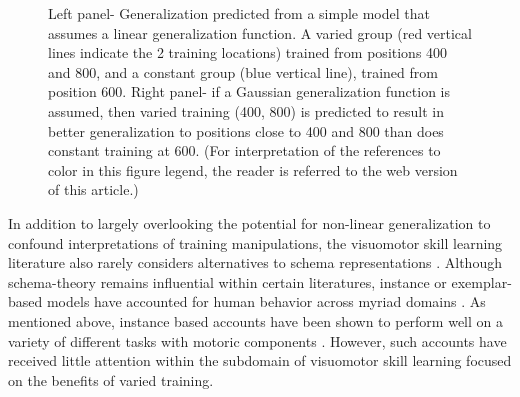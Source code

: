 \documentclass[
  12pt,
  letterpaper,
]{article}
\begin{document}
\begin{figure}


\caption{\label{fig-toy-model1}Left panel- Generalization predicted from
a simple model that assumes a linear generalization function. A varied
group (red vertical lines indicate the 2 training locations) trained
from positions 400 and 800, and a constant group (blue vertical line),
trained from position 600. Right panel- if a Gaussian generalization
function is assumed, then varied training (400, 800) is predicted to
result in better generalization to positions close to 400 and 800 than
does constant training at 600. (For interpretation of the references to
color in this figure legend, the reader is referred to the web version
of this article.)}

\end{figure}%

In addition to largely overlooking the potential for non-linear
generalization to confound interpretations of training manipulations,
the visuomotor skill learning literature also rarely considers
alternatives to schema representations
\autocite{chamberlinMemoryRepresentationMotor1992}. Although
schema-theory remains influential within certain literatures, instance
or exemplar-based models have accounted for human behavior across myriad
domains
\autocite{jamiesonInstanceTheoryDomaingeneral2022,loganInstanceTheoryAttention2002a}.
As mentioned above, instance based accounts have been shown to perform
well on a variety of different tasks with motoric components
\autocite{crumpEpisodicContributionsSequential2010,gandolfoMotorLearningField1996a,meighWhatMemoryRepresentation2018,rosenbaumPlanningReachesEvaluating1995,vandamMappingShapeVisuomotor2015}.
However, such accounts have received little attention within the
subdomain of visuomotor skill learning focused on the benefits of varied
training.
\end{document}
